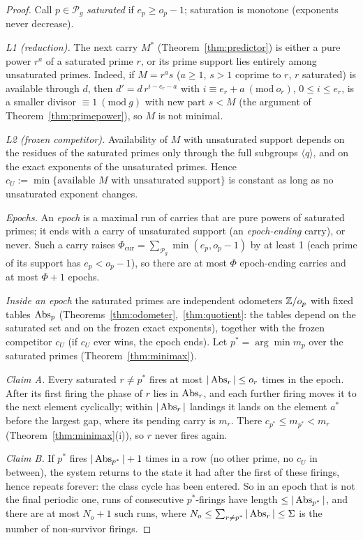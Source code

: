 \begin{proof}
Call \(p\in\mathcal P_g\) \emph{saturated} if \(e_p\ge o_p-1\); saturation is monotone (exponents never decrease).

\emph{L1 (reduction).} The next carry \(M^\ast\) (Theorem~\ref{thm:predictor}) is either a pure power \(r^a\) of a saturated prime \(r\), or its prime support lies entirely among unsaturated primes. Indeed, if \(M=r^as\) (\(a\ge1\), \(s>1\) coprime to \(r\), \(r\) saturated) is available through \(d\), then \(d'=d\,r^{i-e_r-a}\) with \(i\equiv e_r+a\ (\mathrm{mod}\ o_r)\), \(0\le i\le e_r\), is a smaller divisor \(\equiv1\ (\mathrm{mod}\ g)\) with new part \(s<M\) (the argument of Theorem~\ref{thm:primepower}), so \(M\) is not minimal.

\emph{L2 (frozen competitor).} Availability of \(M\) with unsaturated support depends on the residues of the saturated primes only through the full subgroups \(\langle q\rangle\), and on the exact exponents of the unsaturated primes. Hence \(c_U:=\min\{\text{available }M\text{ with unsaturated support}\}\) is constant as long as no unsaturated exponent changes.

\emph{Epochs.} An \emph{epoch} is a maximal run of carries that are pure powers of saturated primes; it ends with a carry of unsaturated support (an \emph{epoch-ending} carry), or never. Such a carry raises \(\Phi_{\mathrm{cur}}=\sum_{\mathcal P_g}\min(e_p,o_p-1)\) by at least 1 (each prime of its support has \(e_p<o_p-1\)), so there are at most \(\Phi\) epoch-ending carries and at most \(\Phi+1\) epochs.

\emph{Inside an epoch} the saturated primes are independent odometers \(\mathbb{Z}/o_p\) with fixed tables \(\operatorname{Abs}_p\) (Theorems~\ref{thm:odometer},~\ref{thm:quotient}: the tables depend on the saturated set and on the frozen exact exponents), together with the frozen competitor \(c_U\) (if \(c_U\) ever wins, the epoch ends). Let \(p^\ast=\arg\min m_p\) over the saturated primes (Theorem~\ref{thm:minimax}).

\emph{Claim A.} Every saturated \(r\ne p^\ast\) fires at most \(|\operatorname{Abs}_r|\le o_r\) times in the epoch. After its first firing the phase of \(r\) lies in \(\operatorname{Abs}_r\), and each further firing moves it to the next element cyclically; within \(|\operatorname{Abs}_r|\) landings it lands on the element \(a^\ast\) before the largest gap, where its pending carry is \(m_r\). There \(c_{p^\ast}\le m_{p^\ast}<m_r\) (Theorem~\ref{thm:minimax}(i)), so \(r\) never fires again.

\emph{Claim B.} If \(p^\ast\) fires \(|\operatorname{Abs}_{p^\ast}|+1\) times in a row (no other prime, no \(c_U\) in between), the system returns to the state it had after the first of these firings, hence repeats forever: the class cycle has been entered. So in an epoch that is not the final periodic one, runs of consecutive \(p^\ast\)-firings have length \(\le|\operatorname{Abs}_{p^\ast}|\), and there are at most \(N_o+1\) such runs, where \(N_o\le\sum_{r\ne p^\ast}|\operatorname{Abs}_r|\le\Sigma\) is the number of non-survivor firings.


\end{proof}
